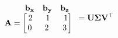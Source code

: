 \documentclass[preview]{standalone}
\begin{document}
\begin{align*}
\begin{array}{ccc}\begin{matrix}\hspace{0.75cm} \mathbf{b_{x}} &  \mathbf{b_{y}} &  \mathbf{b_{z}} \end{matrix} \\ \mathbf{A} = \begin{bmatrix} 2 & \hspace{0.1cm} 1 \hspace{0.1cm}& \hspace{0.1cm} 1 \\ \hspace{0.04cm}  0 \hspace{0.1cm} & \hspace{0.1cm} 2 \hspace{0.1cm}\hspace{0.1cm} & 3 \end{bmatrix} \end{array}= \mathbf{U \Sigma V^\top}
\end{align*}
\end{document}
